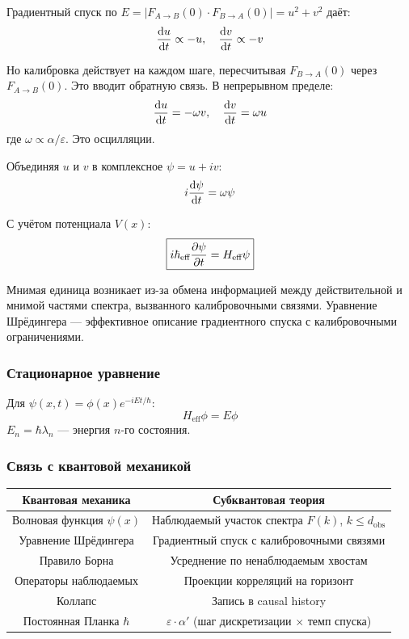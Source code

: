 \documentclass[12pt,a4paper]{article}
\begin{document}
Градиентный спуск по $E = |F_{A \to B}(0) \cdot F_{B \to A}(0)| = u^2 + v^2$ даёт:
\begin{equation}
    \dv{u}{t} \propto -u, \quad \dv{v}{t} \propto -v
\end{equation}

Но калибровка действует на каждом шаге, пересчитывая $F_{B \to A}(0)$ через $F_{A \to B}(0)$. Это вводит обратную связь. В непрерывном пределе:
\begin{equation}
    \dv{u}{t} = -\omega v, \quad \dv{v}{t} = \omega u
\end{equation}
где $\omega \propto \alpha/\varepsilon$. Это осцилляции.

Объединяя $u$ и $v$ в комплексное $\psi = u + iv$:
\begin{equation}
    i \dv{\psi}{t} = \omega \psi
\end{equation}

С учётом потенциала $V(x)$:
\begin{equation}
    \boxed{i \hbar_{\text{eff}} \pdv{\psi}{t} = H_{\text{eff}} \psi}
\end{equation}

Мнимая единица возникает из-за обмена информацией между действительной и мнимой частями спектра, вызванного калибровочными связями. Уравнение Шрёдингера --- эффективное описание градиентного спуска с калибровочными ограничениями.

\subsubsection{Стационарное уравнение}

Для $\psi(x, t) = \phi(x) e^{-iEt/\hbar}$:
\begin{equation}
    H_{\text{eff}} \phi = E \phi
\end{equation}
$E_n = \hbar \lambda_n$ --- энергия $n$-го состояния.

\subsubsection{Связь с квантовой механикой}

\begin{center}
\begin{tabular}{c|c}
\textbf{Квантовая механика} & \textbf{Субквантовая теория} \\
\hline
Волновая функция $\psi(x)$ & Наблюдаемый участок спектра $F(k)$, $k \leq d_{\text{obs}}$ \\
Уравнение Шрёдингера & Градиентный спуск с калибровочными связями \\
Правило Борна & Усреднение по ненаблюдаемым хвостам \\
Операторы наблюдаемых & Проекции корреляций на горизонт \\
Коллапс & Запись в causal history \\
Постоянная Планка $\hbar$ & $\varepsilon \cdot \alpha'$ (шаг дискретизации $\times$ темп спуска)
\end{tabular}
\end{center}
\end{document}
